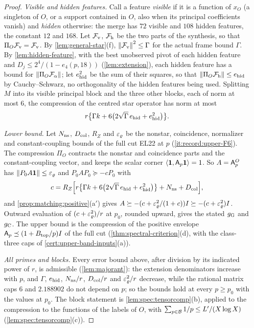 \begin{proof}
\emph{Visible and hidden features.} Call a feature \emph{visible} if it is a
function of $x_O$ (a singleton of $O$, or a support contained in $O$, also when its
principal coefficients vanish) and \emph{hidden} otherwise: the merge has $72$
visible and $108$ hidden features, the constant $12$ and $168$. Let
$\mathcal F_{\rm v}$, $\mathcal F_{\rm h}$ be the two parts of the synthesis, so that
$\Pi_O\mathcal F_{\rm v}=\mathcal F_{\rm v}$. By \cref{lem:general-star}(f),
$\left\|\mathcal F_{\rm v}\right\|^2\le\Gamma$ for the actual frame bound $\Gamma$. By
\cref{lem:hidden-feature}, with the best unobserved pivot of each hidden feature and
$D_j\le2^4/(1-e_4(p,18))$ (\cref{lem:extension}), each hidden feature has a bound
for $\left\|\Pi_O\mathcal F_\alpha\right\|$; let $e_{\rm hid}^2$ be the sum of their squares,
so that $\left\|\Pi_O\mathcal F_{\rm h}\right\|\le e_{\rm hid}$ by Cauchy--Schwarz, no
orthogonality of the hidden features being used. Splitting $M$ into its visible
principal block and the three other blocks, each of norm at most $6$, the
compression of the centred star operator has norm at most
\[
 r\bigl\{\Gamma k+6\bigl(2\sqrt\Gamma\,e_{\rm hid}+e_{\rm hid}^2\bigr)\bigr\}.
\]

\emph{Lower bound.} Let $N_{\rm ns}$, $D_{\rm col}$, $R_Z$ and $\varepsilon_\varrho$ be the
nonstar, coincidence, normalizer and constant-coupling bounds of the full cut EL22
at $p$ (\ref{it:record:upper-F6}). The compression $\Pi_O$ contracts the nonstar and
coincidence parts and the constant-coupling vector, and keeps the scalar corner
$\left\langle \mathbf 1,\mathsf A_p\mathbf 1\right\rangle=1$. So $A=\mathsf A_p^O$ has $\left\|P_0A\mathbf 1\right\|\le\varepsilon_\varrho$ and
$P_0AP_0\succeq-cP_0$ with
\[
 c=R_Z\Bigl[r\bigl\{\Gamma k+6\bigl(2\sqrt\Gamma\,e_{\rm hid}+e_{\rm hid}^2\bigr)\bigr\}
 +N_{\rm ns}+D_{\rm col}\Bigr],
\]
and \cref{prop:matching:positive}(a$'$) gives
$A\succeq-(c+\varepsilon_\varrho^2/(1+c))I\succeq-(c+\varepsilon_\varrho^2)I$. Outward evaluation
of $(c+\varepsilon_\varrho^2)/r$ at $p_0$, rounded upward, gives the stated $g_{\rm G}$ and
$g_{\rm C}$. The upper bound is the compression of the positive envelope
$\mathsf A_p\preceq(1+B_{\rm top}/p)I$ of the full cut (\cref{thm:spectral-criterion}(d), with
the class-three caps of \cref{cert:upper-band-inputs}(a)).

\emph{All primes and blocks.} Every error bound above, after division by its
indicated power of $r$, is admissible (\cref{lem:majorant}): the extension
denominators increase with $p$, and $\Gamma$, $e_{\rm hid}$, $N_{\rm ns}/r$,
$D_{\rm col}/r$ and $\varepsilon_\varrho^2/r$ decrease, while the rational matrix caps $6$
and $2.188902$ do not depend on $p$; so the bounds hold at every $p\ge p_0$ with the
values at $p_0$. The block statement is \cref{lem:spec:tensorcomp}(b), applied to the
compression to the functions of the labels of $O$, with
 $\sum_{p\in\mathcal B}1/p\le L'/(X\log X)$ (\cref{lem:spec:tensorcomp}(c)).
\end{proof}

